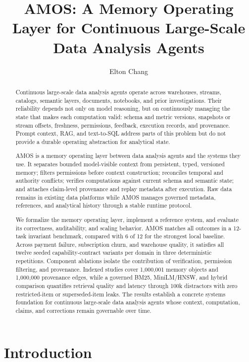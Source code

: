 \documentclass[10pt]{article}
\title{AMOS: A Memory Operating Layer for Continuous Large-Scale Data Analysis Agents}
\author{Elton Chang}
\date{}
\newcommand{\amos}{\textsc{AMOS}\xspace}
\begin{document}
\maketitle

\begin{abstract}
Continuous large-scale data analysis agents operate across warehouses, streams, catalogs, semantic layers, documents, notebooks, and prior investigations. Their reliability depends not only on model reasoning, but on continuously managing the state that makes each computation valid: schema and metric versions, snapshots or stream offsets, freshness, permissions, feedback, execution records, and provenance. Prompt context, RAG, and text-to-SQL address parts of this problem but do not provide a durable operating abstraction for analytical state.

\amos is a memory operating layer between data analysis agents and the systems they use. It separates bounded model-visible context from persistent, typed, versioned memory; filters permissions before context construction; reconciles temporal and authority conflicts; verifies computations against current schema and semantic state; and attaches claim-level provenance and replay metadata after execution. Raw data remains in existing data platforms while \amos manages governed metadata, references, and analytical history through a stable runtime protocol.

We formalize the memory operating layer, implement a reference system, and evaluate its correctness, auditability, and scaling behavior. \amos matches all outcomes in a 12-task invariant benchmark, compared with 6 of 12 for the strongest local baseline. Across payment failure, subscription churn, and warehouse quality, it satisfies all twelve seeded capability-contract variants per domain in three deterministic repetitions. Component ablations isolate the contribution of verification, permission filtering, and provenance. Indexed studies cover 1{,}000{,}001 memory objects and 1{,}000{,}000 provenance edges, while a governed BM25, MiniLM/HNSW, and hybrid comparison quantifies retrieval quality and latency through 100k distractors with zero restricted-item or superseded-item leaks. The results establish a concrete systems foundation for continuous large-scale data analysis agents whose context, computation, claims, and corrections remain governable over time.
\end{abstract}

\section{Introduction}
\end{document}
